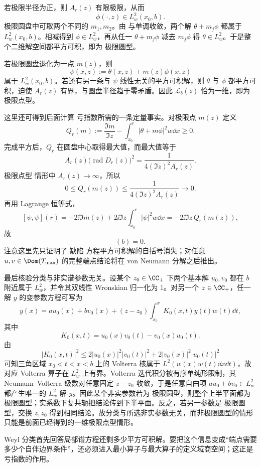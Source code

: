 若极限半径为正，则 $A_r(z)$ 有限极限，从而
\[
 \phi(\cdot,z)\in L^2_w(x_0,b).
\]
极限圆盘中可取两个不同的 $m_1,m_2$。由 与单调收敛，两个解 $\theta+m_j\phi$ 都属于 $L^2_w(x_0,b)$。相减得到 $\phi\in L^2_w$，再从任一 $\theta+m_j\phi$ 减去 $m_j\phi$ 得 $\theta\in L^2_w$。于是整个二维解空间都平方可积，即为 极限圆型。

若极限圆盘退化为一点 $m(z)$，则
\[
 \psi(x,z):=\theta(x,z)+m(z)\phi(x,z)
\]
属于 $L^2_w(x_0,b)$。若还有另一条与 $\psi$ 线性无关的平方可积解，则 $\theta$ 与 $\phi$ 都平方可积，迫使 $A_r(z)$ 有界，与圆盘半径趋于零矛盾。因此 $\mathcal L_b(z)$ 恰为一维，即为 极限点型。

这里还可得到后面计算 亏指数所需的一条定量事实。对极限点 $m(z)$ 定义
\[
 Q_r(m):=
 \frac{\Im m}{\Im z}
 -\int_{x_0}^r|\theta+m\phi|^2w\dd x\ge0.
\]
完成平方后，$Q_r$ 在圆盘中心取得最大值，而最大值等于
\[
 A_r(z)\bigl(\operatorname{rad}D_r(z)\bigr)^2
 =\frac{1}{4(\Im z)^2A_r(z)}.
\]
极限点型 情形中 $A_r(z)\to\infty$，所以
\[
 0\le Q_r(m(z))
 \le\frac{1}{4(\Im z)^2A_r(z)}\longrightarrow0.
\]
再用 Lagrange 恒等式，
\[
 [\psi,\psi](r)
 =-2\ii\Im m(z)
 +2\ii\Im z\int_{x_0}^r|\psi|^2w\dd x
 =-2\ii\Im z\,Q_r(m(z)),
\]
故
\begin{equation*}
 [\psi,\psi](b)=0
 .
\end{equation*}
注意这里先只证明了 缺陷 方程平方可积解的自括号消失；对任意 $u,v\in\Dom(T_{\max})$ 的完整端点结论将在 von Neumann 分解之后推出。

最后核验分类与非实谱参数无关。设某个 $z_0\in\CC_+$ 下两个基本解 $u_0,v_0$ 都在 $b$ 附近属于 $L^2_w$，并令其双线性 Wronskian 归一化为 $1$。对另一个 $z\in\CC_+$，任一解 $y$ 的变参数方程可写为
\[
 y(x)=a u_0(x)+b v_0(x)
 +(z-z_0)\int_{x_0}^{x}K_0(x,t)y(t)w(t)\dd t,
\]
其中
\[
 K_0(x,t)=u_0(x)v_0(t)-v_0(x)u_0(t).
\]
由
\[
 |K_0(x,t)|^2
 \le 2|u_0(x)|^2|v_0(t)|^2
 +2|v_0(x)|^2|u_0(t)|^2
\]
可知三角区域 $x_0<t<x<b$ 上的 Volterra 核属于
$L^2(w(x)w(t)\dd x\dd t)$，故对应 Volterra 算子在 $L^2_w$ 上有界。Volterra 迭代积分被有序单纯形限制，其 Neumann--Volterra 级数对任意固定 $z-z_0$ 收敛，于是任意自由项 $a u_0+b v_0\in L^2_w$ 都产生唯一的 $L^2_w$ 解 $y$。因此某个非实参数若为 极限圆型，则整个上半平面都为 极限圆型；实系数下复共轭把结论传到下半平面。反之，若另一参数是 极限圆型，交换 $z,z_0$ 得到相同结论。故分类与所选非实参数无关，而非极限圆型的情形只能是前面已经得到的一维极限点型情形。

Weyl 分类首先回答局部谱方程还剩多少平方可积解。要把这个信息变成“端点需要多少个自伴边界条件”，还必须进入最小算子与最大算子的定义域商空间；这正是 亏指数的作用。

